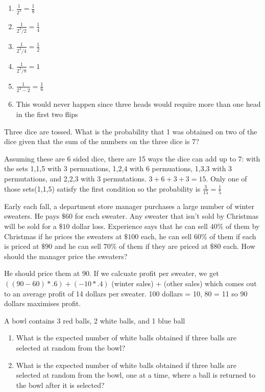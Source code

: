 \documentclass{homework}
\begin{document}
\begin{sol}

  \begin{enumerate}[label=(\alph*)]
    \item $\frac{1}{2^3} = \frac{1}{8}$
    \item $\frac{1}{2^3/2} = \frac{1}{4}$
    \item $\frac{1}{2^3/4} = \frac{1}{2}$
    \item $\frac{1}{2^3/8} = 1$
    \item $\frac{1}{2^3 - 2} = \frac{1}{6}$
    \item This would never happen since three heads would require more than one head in the first two flips
  \end{enumerate}

\end{sol}

\question Three dice are tossed. What is the probability that 1 was obtained on two of the dice given that the sum of the numbers on the three dice is 7?

\begin{sol}
  Assuming these are 6 sided dice, there are 15 ways the dice can add up to 7: with the sets {1,1,5} with 3 permuations, {1,2,4} with 6 permuations, {1,3,3} with 3 permutations, and {2,2,3} with 3 permutations. $3+6+3+3=15$. Only one of those sets({1,1,5}) satisfy the first condition so the probability is $\frac{3}{15} = \frac{1}{5}$
\end{sol}

\question Early each fall, a department store manager purchases a large number of winter sweaters. He pays $\$60$ for each sweater. Any sweater that isn’t sold by Christmas will be sold for a $\$10$ dollar loss. Experience says that he can sell $40\%$ of them by Christmas if he prices the sweaters at $\$100$ each, he can sell $60\%$ of them if each is priced at $\$90$ and he can sell $70\%$ of them if they are priced at $\$80$ each. How should the manager price the sweaters?

\begin{sol}
  He should price them at 90. If we calcuate profit per sweater, we get $((90-60)*.6)+(-10*.4)$ (winter sales) + (other sales) which comes out to an average profit of 14 dollars per sweater. 100 dollars = 10, 80 = 11 so 90 dollars maximises profit.
\end{sol}

\question A bowl contains 3 red balls, 2 white balls, and 1 blue ball
\begin{enumerate}[label=(\alph*)]
	\item What is the expected number of white balls obtained if three balls are selected at random from the bowl?
	\item What is the expected number of white balls obtained if three balls are selected at random from the bowl, one at a time, where a ball is returned to the bowl after it is selected?
\end{enumerate}
\end{document}
